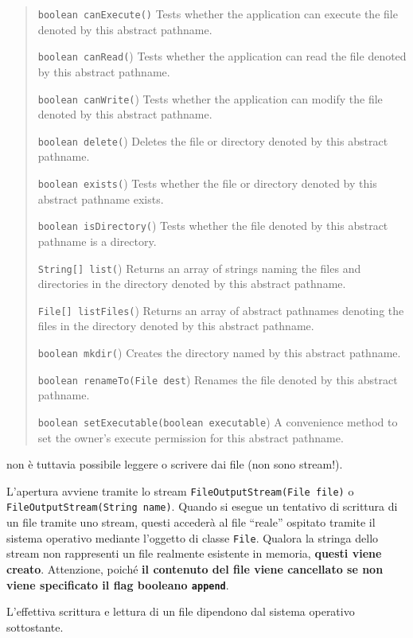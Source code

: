 \documentclass[\fontsizeclass,twocolumn]{\classname}
\theoremstyle{definition}
\theoremstyle{definition}
\begin{document}
\begin{quote}
    \footnotesize{\texttt{boolean 	canExecute()} 	Tests whether the application can execute the file denoted by this abstract pathname.

\texttt{boolean 	canRead(}) 	Tests whether the application can read the file denoted by this abstract pathname.

\texttt{boolean 	canWrite(}) 	Tests whether the application can modify the file denoted by this abstract pathname.

\texttt{boolean 	delete(}) 	Deletes the file or directory denoted by this abstract pathname.

\texttt{boolean 	exists(}) 	Tests whether the file or directory denoted by this abstract pathname exists.

\texttt{boolean 	isDirectory(}) 	Tests whether the file denoted by this abstract pathname is a directory.

\texttt{String[] 	list(}) 	Returns an array of strings naming the files and directories in the directory denoted by this abstract pathname.

\texttt{File[] 	listFiles(}) 	Returns an array of abstract pathnames denoting the files in the directory denoted by this abstract pathname.

\texttt{boolean 	mkdir(}) 	Creates the directory named by this abstract pathname.

\texttt{boolean 	renameTo(File dest}) 	Renames the file denoted by this abstract pathname.

\texttt{boolean 	setExecutable(boolean executable}) 	A convenience method to set the owner's execute permission for this abstract pathname.}
\end{quote}

non è tuttavia possibile leggere o scrivere dai file (non sono stream!). 

L'apertura avviene tramite lo stream \texttt{FileOutputStream(File file)} o
\texttt{FileOutputStream(String name)}. Quando si esegue un tentativo di
scrittura di un file tramite uno stream, questi accederà al file ``reale''
ospitato tramite il sistema operativo mediante l'oggetto di classe
\texttt{File}. Qualora la stringa dello stream non rappresenti un file
realmente esistente in memoria, \textbf{questi viene creato}. Attenzione,
poiché \textbf{il contenuto del file viene cancellato se non viene specificato
il flag booleano \texttt{append}}.

L'effettiva scrittura e lettura di un file dipendono dal sistema operativo
sottostante.
\end{document}
